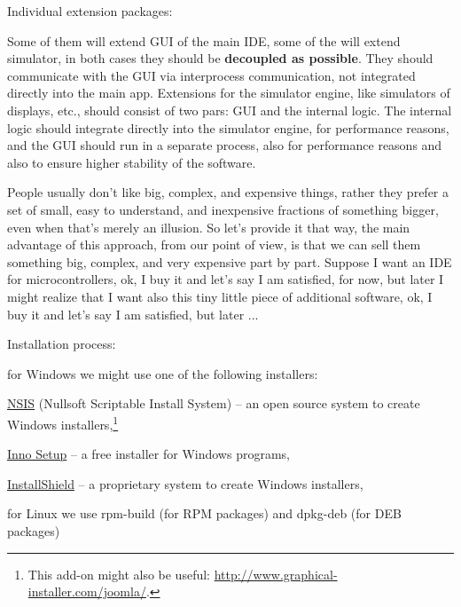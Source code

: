 \documentclass[a4paper,twoside,15pt]{book}
\begin{document}
\begin{dinglist}{73}
                \item Individual extension packages:
                    \begin{dinglist}{75}
                        \item Some of them will extend GUI of the main IDE, some of the will extend simulator, in both cases they should be \textbf{decoupled as possible}. They should communicate with the GUI via interprocess communication, not integrated directly into the main app. Extensions for the simulator engine, like simulators of displays, etc., should consist of two pars: GUI and the internal logic. The internal logic should integrate directly into the simulator engine, for performance reasons, and the GUI should run in a separate process, also for performance reasons and also to ensure higher stability of the software.
                        \item People usually don't like big, complex, and expensive things, rather they prefer a set of small, easy to understand, and inexpensive fractions of something bigger, even when that's merely an illusion. So let's provide it that way, the main advantage of this approach, from our point of view, is that we can sell them something big, complex, and very expensive part by part. Suppose I want an IDE for microcontrollers, ok, I buy it and let's say I am satisfied, for now, but later I might realize that I want also this tiny little piece of additional software, ok, I buy it and let's say I am satisfied, but later ...
                    \end{dinglist}
                \item Installation process:
                    \begin{dinglist}{75}
                        \item for Windows we might use one of the following installers:
                            \begin{dinglist}{72}
                                \item \href{http://nsis.sourceforge.net/Main_Page}{NSIS} (Nullsoft Scriptable Install System) -- an open source system to create Windows installers,\footnote{This add-on might also be useful: \url{http://www.graphical-installer.com/joomla/}.}
                                \item \href{http://www.jrsoftware.org/isinfo.php}{Inno Setup} -- a free installer for Windows programs,
                                \item \href{http://www.flexerasoftware.com/products/installshield.htm}{InstallShield} -- a proprietary system to create Windows installers,
                            \end{dinglist}
                        \item for Linux we use rpm-build (for RPM packages) and dpkg-deb (for DEB packages)
                    \end{dinglist}
            \end{dinglist}
\end{document}
